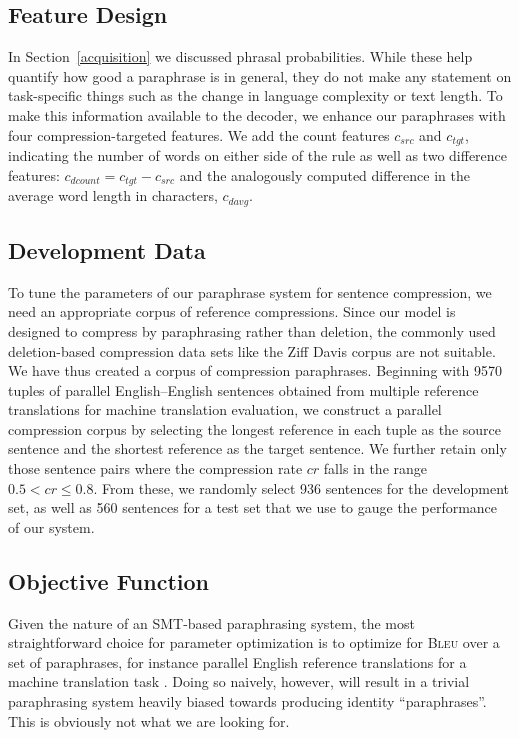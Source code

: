 \documentclass[11pt]{article}
\begin{document}
\subsection{Feature Design}
In Section~\ref{acquisition} we discussed phrasal
probabilities. While these help quantify how good a paraphrase is in
general, they do not make any statement on task-specific things such
as the change in language complexity or text length. To make this
information available to the decoder, we enhance our paraphrases with
four compression-targeted features. We add the count features
$c_{\mathit{src}}$ and $c_{\mathit{tgt}}$, indicating the number of
words on either side of the rule as well as two difference features:
$c_{\mathit{dcount}} = c_{\mathit{tgt}} - c_{\mathit{src}}$ and the
analogously computed difference in the average word length in
characters, $c_{\mathit{davg}}$.

\subsection{Development Data}
\label{dev-data}
To tune the parameters of our paraphrase system for sentence
compression, we need an appropriate corpus of reference
compressions. Since our model is designed to compress by paraphrasing
rather than deletion, the commonly used deletion-based compression
data sets like the Ziff Davis corpus are not suitable. We have
thus created a corpus of compression paraphrases. Beginning with 9570
tuples of parallel English--English sentences obtained from multiple
reference translations for machine translation evaluation, we
construct a parallel compression corpus by selecting the longest
reference in each tuple as the source sentence and the shortest
reference as the target sentence. We further retain only those
sentence pairs where the compression rate $\mathit{cr}$ falls in the range $0.5 <
\mathit{cr} \leq 0.8$. From these, we randomly select 936
sentences for the development set, as well as 560 sentences for a test
set that we use to gauge the performance of our system.


\subsection{Objective Function}
\label{objective-fn}

Given the nature of an SMT-based paraphrasing system, the most
straightforward choice for parameter optimization is to optimize for
\textsc{Bleu} over a set of paraphrases, for instance parallel English
reference translations for a machine translation task
\cite{Madnani2007}. Doing so naively, however, will result in a
trivial paraphrasing system heavily biased towards producing identity
``paraphrases''. This is obviously not what we are looking for.
\end{document}
